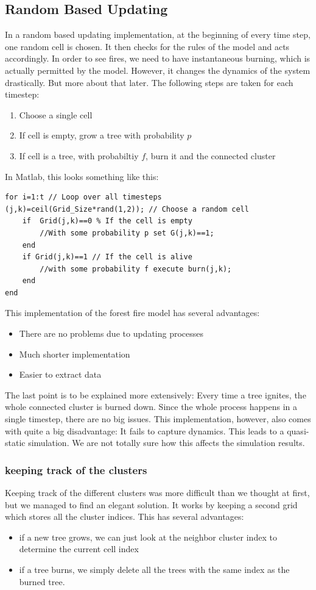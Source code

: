 \documentclass[11pt]{article}
\begin{document}
\subsection{Random Based Updating}
In a random based updating implementation, at the beginning of every time step, one random cell is chosen. It then checks for the rules of the model and acts accordingly. In order to see fires, we need to have instantaneous burning, which is actually permitted by the model. However, it changes the dynamics of the system drastically. But more about that later. The following steps are taken for each timestep:

\begin{enumerate}
\item Choose a single cell
\item If cell is empty, grow a tree with probability $p$
\item If cell is a tree, with probabiltiy $f$, burn it and the connected cluster
\end{enumerate}
In Matlab, this looks something like this:

\begin{verbatim}
for i=1:t // Loop over all timesteps
(j,k)=ceil(Grid_Size*rand(1,2)); // Choose a random cell
	if  Grid(j,k)==0 % If the cell is empty
		//With some probability p set G(j,k)==1;
	end
	if Grid(j,k)==1 // If the cell is alive
		//with some probability f execute burn(j,k);
	end
end
\end{verbatim}

This implementation of the forest fire model has several advantages:
\begin{itemize}
\item There are no problems due to updating processes
\item Much shorter implementation
\item Easier to extract data
\end{itemize}
The last point is to be explained more extensively: Every time a tree ignites, the whole connected cluster is burned down. Since the whole process happens in a single timestep, there are no big issues.
This implementation, however, also comes with quite a big disadvantage: It fails to capture dynamics. This leads to a quasi-static simulation. We are not totally sure how this affects the simulation results.

\subsubsection{keeping track of the clusters}
Keeping track of the different clusters was more difficult than we thought at first, but we managed to find an elegant solution. It works by keeping a second grid which stores all the cluster indices. This has several advantages:
\begin{itemize}
\item if a new tree grows, we can just look at the neighbor cluster index to determine the current cell index
\item if a tree burns, we simply delete all the trees with the same index as the burned tree.
\end {itemize}
\end{document}
